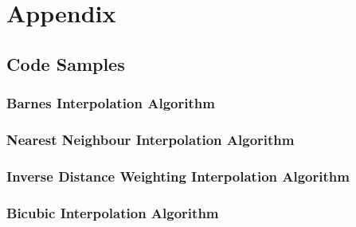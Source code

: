 \chapter{Appendix}\label{Appendix}

    \section{Code Samples}
        
        \subsection{Barnes Interpolation Algorithm}


        \subsection{Nearest Neighbour Interpolation Algorithm}


        \subsection{Inverse Distance Weighting Interpolation Algorithm}


        \subsection{Bicubic Interpolation Algorithm}

